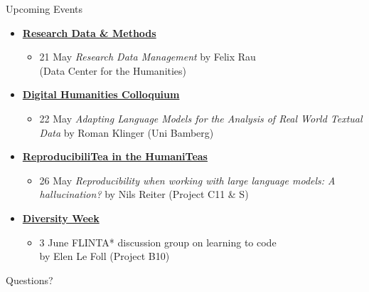 \documentclass[
  ignorenonframetext,
  aspectratio=32,
]{beamer}
\providecommand{\tightlist}{%
  \setlength{\itemsep}{0pt}\setlength{\parskip}{0pt}}\usepackage{longtable,booktabs,array}
\begin{document}
\begin{frame}{Upcoming Events}
\label{upcoming-events}
\begin{itemize}
\tightlist
\item
  \href{https://sfb1252.uni-koeln.de/en/early-career/events/workshops/research-data-and-methods}{\textbf{Research
  Data \& Methods}}

  \begin{itemize}
  \tightlist
  \item
    21 May \textbar{} \emph{Research Data Management} by Felix Rau\\
    (Data Center for the Humanities)
  \end{itemize}
\item
  \href{https://lehre.idh.uni-koeln.de/lehrveranstaltungen/sommersemester-2025/digital-humanities-cologne/}{\textbf{Digital
  Humanities Colloquium}}

  \begin{itemize}
  \tightlist
  \item
    22 May \textbar{} \emph{Adapting Language Models for the Analysis of
    Real World Textual Data} by Roman Klinger (Uni Bamberg)
  \end{itemize}
\item
  \href{https://ub.uni-koeln.de/en/courses-consultations/specials/reproducibilitea-in-the-humaniteas}{\textbf{ReproducibiliTea
  in the HumaniTeas}}

  \begin{itemize}
  \tightlist
  \item
    26 May \textbar{} \emph{Reproducibility when working with large
    language models: A hallucination?} by Nils Reiter (Project C11 \& S)
  \end{itemize}
\item
  \href{https://vielfalt.uni-koeln.de/en/news/diversity-week-you-make-the-difference}{\textbf{Diversity
  Week}}

  \begin{itemize}
  \tightlist
  \item
    3 June \textbar{} FLINTA* discussion group on learning to code\\
    by Elen Le Foll (Project B10)
  \end{itemize}
\end{itemize}
\end{frame}

\begin{frame}[standout]{}
\label{section}
Questions?
\end{frame}
\end{document}
